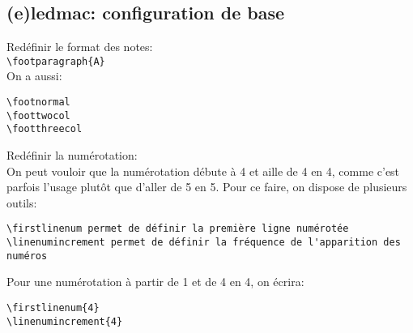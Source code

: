 \documentclass[a4paper,twoside,french,12pt]{book}
\begin{document}
%

\subsection{(e)ledmac: configuration de base}


Redéfinir le format des notes:\\
\verb=\footparagraph{A}=\\
On a aussi:\\
\begin{verbatim}
\footnormal
\foottwocol
\footthreecol
\end{verbatim}

Redéfinir la numérotation:\\
On peut vouloir que la numérotation débute à 4 et aille de 4 en 4, comme c'est parfois l'usage plutôt que d'aller de 5 en 5. Pour ce faire, on dispose de plusieurs outils:
\begin{verbatim}
\firstlinenum permet de définir la première ligne numérotée
\linenumincrement permet de définir la fréquence de l'apparition des numéros
\end{verbatim}
Pour une numérotation à partir de 1 et de 4 en 4, on écrira:
\begin{verbatim}
\firstlinenum{4}
\linenumincrement{4}
\end{verbatim}
\end{document}
